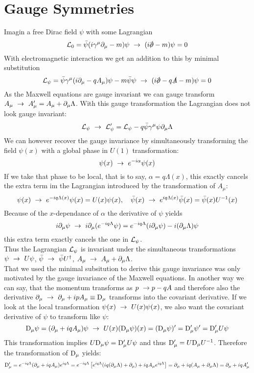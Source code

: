 \section{Gauge Symmetries}
Imagin a free Dirac field $\psi$ with some Lagrangian
\[ \LL_0 = \bar{\psi}( i \gamma^\mu \p_\mu - m) \psi ~\df~(i \slashed{\p} - m )\psi = 0\]
With electromagnetic interaction we get an addition to this by minimal substitution
\[ \LL_\psi = \bar{\psi}\gamma^\mu ( i \p_\mu - q A_\mu) \psi - m \bar{\psi}\psi ~\df~ (i \slashed{\p} - q \slashed{A}- m) \psi = 0\]
As the Maxwell equations are gauge invariant we can gauge transform $A_\mu ~\rightarrow~A'_\mu = A_\mu + \partial_\mu \Lambda$. With this gauge transformation the Lagrangian does not look gauge invariant:
\[\mathcal{L}_\psi ~\rightarrow~ \mathcal{L}'_\psi = \mathcal{L}_\psi - q \bar{\psi}\gamma^\mu \psi \partial_\mu \Lambda\]
We can however recover the gauge invariance by simultaneously transforming the field $\psi(x)$ with a global phase in $U(1)$ transformation:
\[ \psi(x) ~\rightarrow~ e^{-i \alpha} \psi(x)\]
If we take that phase to be local, that is to say, $\alpha = q \Lambda(x)$, this exactly cancels the extra term im the Lagrangian introduced by the transformation of $A_\mu$:
\[ \psi(x) ~\rightarrow~ e^{-iq \Lambda(x)} \psi(x) = U(x) \psi(x),~~~ \bar{\psi}(x) ~\rightarrow~ e^{iq\Lambda(x)} \bar{\psi}(x) = \bar{\psi}(x) U^{-1}(x)\]
Because of the $x$-dependance of $\alpha$ the derivative of $\psi$ yields
\[ i \partial_\mu \psi ~\rightarrow~ i \partial_\mu ( e^{-iq\Lambda} \psi) = e^{-iq\Lambda}(i \partial_\mu \psi) - i ( \partial_\mu\Lambda) \psi\]
this extra term exactly cancels the one in $\mathcal{L}_\psi$.\\
Thus the Lagrangian $\mathcal{L}_\psi$ is invariant under the simultaneous transformations $\psi ~\rightarrow~U\psi$, $\bar{\psi}~\rightarrow~\bar{\psi}U^\dagger$, $A_\mu ~\rightarrow~A_\mu + \partial_\mu \Lambda$.\\
That we used the minimal subsitution to derive this gauge invariance was only motivated by the gauge invariance of the Maxwell equations. In another way we can say, that the momentum transforms as $p ~\rightarrow p - q A$ and therefore also the derivative $\partial_\mu ~\rightarrow~ \partial_\mu + i p A_\mu \equiv {\rm D}_\mu$ transforms into the covariant derivative. If we look at the local transformation $\psi(x) ~\rightarrow~ U(x)\psi(x)$, we also want the covariant derivative of $\psi$ to transform like $\psi$:
\[ {\rm D}_\mu \psi = ( \partial _\mu + i q A_\mu) \psi ~\rightarrow~ U(x)( {\rm D}_\mu \psi)(x) = ({\rm D}_\mu\psi)' = {\rm D}'_\mu \psi' = {\rm D}'_\mu U \psi \]
This transformation implies $U{\rm D}_\mu \psi = {\rm D}'_\mu U \psi$ and thus ${\rm D}'_\mu = U {\rm D}_\mu U^{-1}$. Therefore the transformation of ${\rm D}_\mu$ yields:
\[ {\rm D}'_\mu = e^{-iq\Lambda}( \partial_\mu + i q A_\mu) e^{i q \Lambda} = e^{-iq\Lambda}\left[ e^{iq\Lambda}(iq (\partial_\mu \Lambda) + \partial_\mu) + i q A_\mu e^{iq\Lambda}\right] = \partial_\mu + iq(A_\mu + \partial_\mu \Lambda) = \partial_\mu + iq A'_\mu\]
